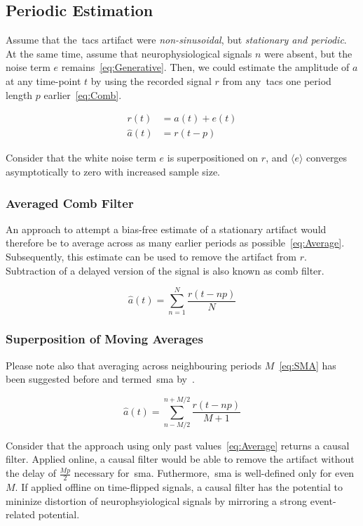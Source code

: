 \documentclass[a4paper]{article}
\begin{document}
\subsection{Periodic Estimation}
Assume that the~\gls{tacs} artifact were \emph{non-sinusoidal}, but \emph{stationary and periodic}. At the same time, assume that neurophysiological signals $n$ were absent, but the noise term $e$ remains~\eqref{eq:Generative}. Then, we could estimate the amplitude of $a$ at any time-point $t$ by using the recorded signal $r$ from any~\gls{tacs} one period length $p$ earlier~\eqref{eq:Comb}.

\begin{align}
    r(t) & = a(t) + e(t)\label{eq:Generative}\\
    \hat{a}(t) & = r(t-p)\label{eq:Comb}
\end{align}

Consider that the white noise term $e$ is superpositioned on $r$, and  $\langle e\rangle$ converges asymptotically to zero with increased sample size.

\subsubsection{Averaged Comb Filter}

An approach to attempt a bias-free estimate of a stationary artifact would therefore be to average across as many earlier periods as possible~\eqref{eq:Average}. Subsequently, this estimate can be used to  remove the artifact from $r$. Subtraction of a delayed version of the signal is also known as comb filter.

\begin{equation}
    \hat{a}(t) = \sum_{n=1}^{N} \frac{r(t - np)}{N}\label{eq:Average}
\end{equation}

\subsubsection{Superposition of Moving Averages}
Please note also that averaging across neighbouring periods $M$~\eqref{eq:SMA} has been suggested before and termed~\gls{sma} by~\cite{Kohli_2015}.

\begin{equation}
    \hat{a}(t) = \sum_{n-M/2}^{n+M/2} \frac{r(t - np)}{M+1}\label{eq:SMA}
\end{equation}

Consider that the approach using only past values~\eqref{eq:Average} returns a causal filter. Applied online, a causal filter would be able to remove the artifact without the delay of $\frac{M p}{2}$ necessary for~\gls{sma}. Futhermore,~\gls{sma} is well-defined only for even $M$. If applied offline on time-flipped signals, a causal filter has the potential to mininize distortion of neurophsyiological signals by mirroring a strong event-related potential.
\end{document}
